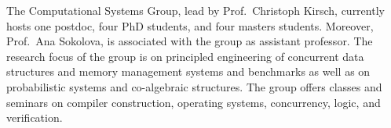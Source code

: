 The Computational Systems Group, lead by Prof.~Christoph Kirsch, currently hosts one postdoc, four PhD students, and four masters students. Moreover, Prof.~Ana Sokolova, is associated with the group as assistant professor. The research focus of the group is on principled engineering of concurrent data structures and memory management systems and benchmarks as well as on probabilistic systems and co-algebraic structures. The group offers classes and seminars on compiler construction, operating systems, concurrency, logic, and verification.